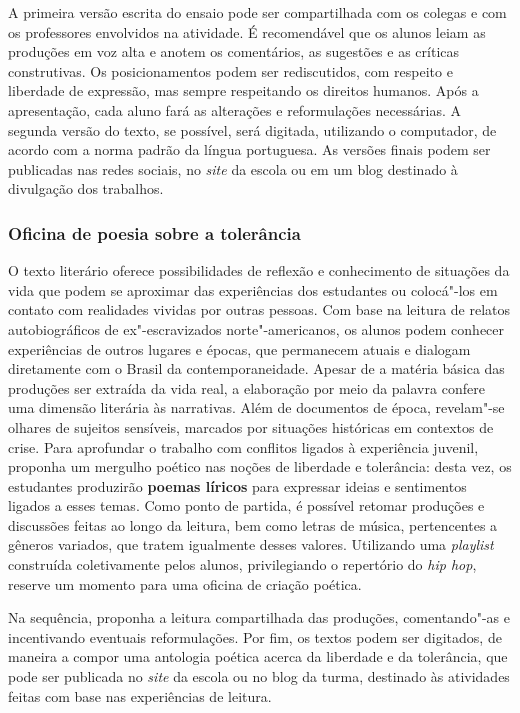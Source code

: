 \documentclass[11pt]{extarticle}
\begin{document}
A primeira versão escrita do ensaio pode ser compartilhada com os
colegas e com os professores envolvidos na atividade. É recomendável que
os alunos leiam as produções em voz alta e anotem os comentários, as
sugestões e as críticas construtivas. Os posicionamentos podem ser
rediscutidos, com respeito e liberdade de expressão, mas sempre
respeitando os direitos humanos. Após a apresentação, cada aluno fará as
alterações e reformulações necessárias. A segunda versão do texto, se possível, 
será digitada, utilizando o computador, de acordo com a norma padrão da
língua portuguesa. As versões finais podem ser publicadas nas redes
sociais, no \emph{site} da escola ou em um blog destinado à divulgação
dos trabalhos.

\subsubsection{Oficina de poesia sobre a tolerância}


  O texto literário oferece possibilidades de reflexão e conhecimento de
  situações da vida que podem se aproximar das experiências dos
  estudantes ou colocá"-los em contato com realidades vividas por outras
  pessoas. Com base na leitura de relatos autobiográficos de
  ex"-escravizados norte"-americanos, os alunos podem conhecer
  experiências de outros lugares e épocas, que permanecem atuais e
  dialogam diretamente com o Brasil da contemporaneidade. Apesar de a
  matéria básica das produções ser extraída da vida real, a elaboração
  por meio da palavra confere uma dimensão literária às narrativas. Além
  de documentos de época, revelam"-se olhares de sujeitos sensíveis,
  marcados por situações históricas em contextos de crise. Para
  aprofundar o trabalho com conflitos ligados à experiência juvenil,
  proponha um mergulho poético nas noções de liberdade e tolerância:
  desta vez, os estudantes produzirão \textbf{poemas líricos} para
  expressar ideias e sentimentos ligados a esses temas. Como ponto de
  partida, é possível retomar produções e discussões feitas ao longo da
  leitura, bem como letras de música, pertencentes a gêneros variados,
  que tratem igualmente desses valores. Utilizando uma \emph{playlist}
  construída coletivamente pelos alunos, privilegiando o repertório do
  \emph{hip hop}, reserve um momento para uma oficina de criação
  poética. 

  Na sequência, proponha a leitura compartilhada das produções,
  comentando"-as e incentivando eventuais reformulações. Por fim, os
  textos podem ser digitados, de maneira a compor uma antologia poética
  acerca da liberdade e da tolerância, que pode ser publicada no
  \emph{site} da escola ou no blog da turma, destinado às atividades
  feitas com base nas experiências de leitura.
\end{document}
